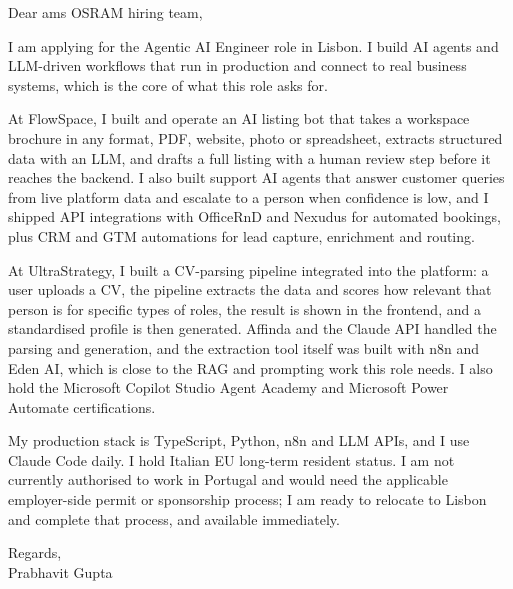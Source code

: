 \documentclass[a4paper,11pt]{article}
\begin{document}
Dear ams OSRAM hiring team,

I am applying for the Agentic AI Engineer role in Lisbon. I build AI agents and LLM-driven workflows that run in production and connect to real business systems, which is the core of what this role asks for.

At FlowSpace, I built and operate an AI listing bot that takes a workspace brochure in any format, PDF, website, photo or spreadsheet, extracts structured data with an LLM, and drafts a full listing with a human review step before it reaches the backend. I also built support AI agents that answer customer queries from live platform data and escalate to a person when confidence is low, and I shipped API integrations with OfficeRnD and Nexudus for automated bookings, plus CRM and GTM automations for lead capture, enrichment and routing.

At UltraStrategy, I built a CV-parsing pipeline integrated into the platform: a user uploads a CV, the pipeline extracts the data and scores how relevant that person is for specific types of roles, the result is shown in the frontend, and a standardised profile is then generated. Affinda and the Claude API handled the parsing and generation, and the extraction tool itself was built with n8n and Eden AI, which is close to the RAG and prompting work this role needs. I also hold the Microsoft Copilot Studio Agent Academy and Microsoft Power Automate certifications.

My production stack is TypeScript, Python, n8n and LLM APIs, and I use Claude Code daily. I hold Italian EU long-term resident status. I am not currently authorised to work in Portugal and would need the applicable employer-side permit or sponsorship process; I am ready to relocate to Lisbon and complete that process, and available immediately.

Regards,\\
Prabhavit Gupta
\end{document}
